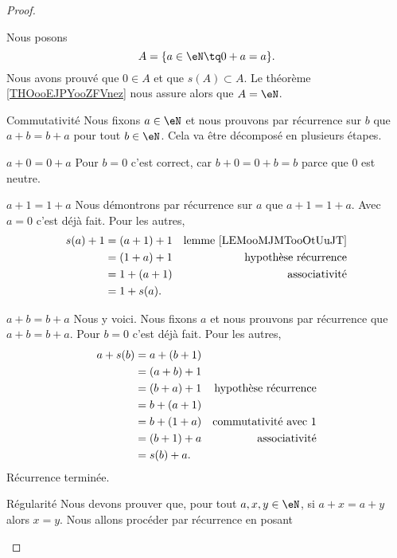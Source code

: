 \begin{proof}
\begin{subproof}
		Nous posons
		\begin{equation}
			A=\{ a\in \eN\tq 0+a=a \}.
		\end{equation}
		Nous avons prouvé que \( 0\in A\) et que \( s(A)\subset A\). Le théorème \ref{THOooEJPYooZFVnez} nous assure alors que \( A=\eN\).
		\item[Commutativité]
		Nous fixons \( a\in \eN\) et nous prouvons par récurrence sur \( b\) que \( a+b=b+a\) pour tout \( b\in \eN\). Cela va être décomposé en plusieurs étapes.
		\item[\( a+0=0+a\)]
		Pour \( b=0\) c'est correct, car \( b+0=0+b=b\) parce que \( 0\) est neutre.
		\item[\( a+1=1+a\)]
		Nous démontrons par récurrence sur \( a\) que \( a+1=1+a\). Avec \( a=0\) c'est déjà fait. Pour les autres,
		\begin{subequations}
			\begin{align}
				s(a)+1 & =(a+1)+1 & \text{lemme \ref{LEMooMJMTooOtUuJT}} \\
				       & =(1+a)+1 & \text{hypothèse récurrence}          \\
				       & =1+(a+1) & \text{associativité}                 \\
				       & =1+s(a).
			\end{align}
		\end{subequations}
		\item[\( a+b=b+a\)]
		Nous y voici. Nous fixons \( a\) et nous prouvons par récurrence que \( a+b=b+a\). Pour \( b=0\) c'est déjà fait. Pour les autres,
		\begin{subequations}
			\begin{align}
				a+s(b) & =a+(b+1)                                    \\
				       & =(a+b)+1                                    \\
				       & =(b+a)+1 & \text{hypothèse récurrence}      \\
				       & =b+(a+1)                                    \\
				       & =b+(1+a) & \text{commutativité avec \( 1\)} \\
				       & =(b+1)+a & \text{associativité}             \\
				       & =s(b)+a.
			\end{align}
		\end{subequations}
		Récurrence terminée.
		\item[Régularité]
		Nous devons prouver que, pour tout \( a,x,y\in \eN\), si \( a+x=a+y\) alors \( x=y\). Nous allons procéder par récurrence en posant

\end{subproof}
\end{proof}
